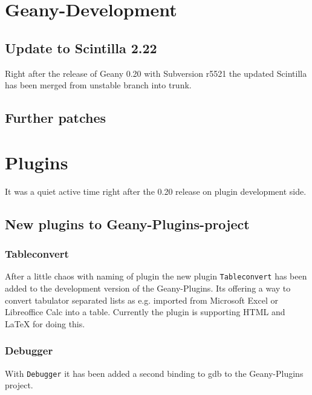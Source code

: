 \documentclass[%
paper=a4,%
fontsize=11pt,%
twoside=false,%
DIV18,
headsepline,
plainheadsepline,
footsepline,
plainfootsepline,
parskip=half,%
openany,%
]{scrartcl}
\begin{document}
\section{Geany-Development}
\subsection{Update to Scintilla 2.22}

Right after the release of Geany 0.20 with Subversion r5521 the
updated Scintilla has been merged from unstable branch into trunk.

\subsection{Further patches}

\section{Plugins}

It was a quiet active time right after the 0.20 release on plugin
development side.

\subsection{New plugins to Geany-Plugins-project}
\subsubsection{Tableconvert}

After a little chaos with naming of plugin the new plugin \texttt{Tableconvert}
has been added to the development version of the Geany-Plugins. Its
offering a way to convert tabulator separated lists as e.g. imported
from Microsoft Excel or Libreoffice Calc into a table. Currently the
plugin is supporting HTML and \LaTeX{} for doing this.

\subsubsection{Debugger}

With \texttt{Debugger} it has been added a second binding to gdb to
the Geany-Plugins project.
\end{document}

